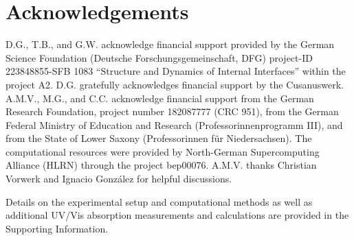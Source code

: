\documentclass[journal=jpclcd,manuscript=letter]{achemso}
\begin{document}
\section*{Acknowledgements}
D.G., T.B., and G.W. acknowledge financial support provided by the German Science Foundation (Deutsche Forschungsgemeinschaft, DFG) project-ID 223848855-SFB 1083 “Structure and Dynamics of Internal Interfaces” within the project A2. D.G. gratefully acknowledges financial support by the Cusanuswerk. A.M.V., M.G., and C.C. acknowledge financial support from the German Research Foundation, project number 182087777 (CRC 951), from the German Federal Ministry of Education and Research (Professorinnenprogramm III), and from the State of Lower Saxony (Professorinnen für Niedersachsen). The computational resources were provided by North-German Supercomputing Alliance (HLRN) through the project bep00076. A.M.V. thanks Christian Vorwerk and Ignacio Gonz\'alez for helpful discussions. 


\begin{suppinfo}
Details on the experimental setup and computational methods as well as additional UV/Vis absorption measurements and calculations are provided in the Supporting Information. 
\end{suppinfo}



%
\end{document}
